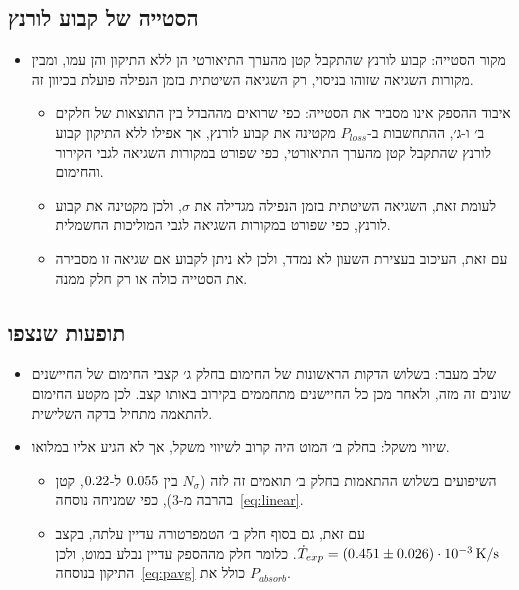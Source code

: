 \documentclass[10pt,a4paper]{article}
\newcommand{\U}[1]{\,\mathrm{#1}}
\begin{document}
\subsection*{הסטייה של קבוע לורנץ}
\begin{itemize}\setlength{\itemsep}{2pt}\setlength{\parskip}{0pt}
  \item מקור הסטייה: קבוע לורנץ שהתקבל קטן מהערך התיאורטי הן ללא התיקון והן עמו, ומבין מקורות השגיאה שזוהו בניסוי, רק השגיאה השיטתית בזמן הנפילה פועלת בכיוון זה.
  \begin{itemize}\setlength{\itemsep}{0pt}\setlength{\parskip}{0pt}
    \item איבוד ההספק אינו מסביר את הסטייה: כפי שרואים מההבדל בין התוצאות של חלקים ב׳ ו-ג׳, ההתחשבות ב-$P_{loss}$ מקטינה את קבוע לורנץ, אך אפילו ללא התיקון קבוע לורנץ שהתקבל קטן מהערך התיאורטי, כפי שפורט במקורות השגיאה לגבי הקירור והחימום.
    \item לעומת זאת, השגיאה השיטתית בזמן הנפילה מגדילה את $\sigma$, ולכן מקטינה את קבוע לורנץ, כפי שפורט במקורות השגיאה לגבי המוליכות החשמלית.
    \item עם זאת, העיכוב בעצירת השעון לא נמדד, ולכן לא ניתן לקבוע אם שגיאה זו מסבירה את הסטייה כולה או רק חלק ממנה.
  \end{itemize}
\end{itemize}

\subsection*{תופעות שנצפו}
\begin{itemize}\setlength{\itemsep}{2pt}\setlength{\parskip}{0pt}
  \item שלב מעבר: בשלוש הדקות הראשונות של החימום בחלק ג׳ קצבי החימום של החיישנים שונים זה מזה, ולאחר מכן כל החיישנים מתחממים בקירוב באותו קצב. לכן מקטע החימום להתאמה מתחיל בדקה השלישית.
  \item שיווי משקל: בחלק ב׳ המוט היה קרוב לשיווי משקל, אך לא הגיע אליו במלואו.
  \begin{itemize}\setlength{\itemsep}{0pt}\setlength{\parskip}{0pt}
    \item השיפועים בשלוש ההתאמות בחלק ב׳ תואמים זה לזה ($N_\sigma$ בין $0.055$ ל-$0.22$, קטן בהרבה מ-3), כפי שמניחה נוסחה~\eqref{eq:linear}.
    \item עם זאת, גם בסוף חלק ב׳ הטמפרטורה עדיין עלתה, בקצב $\dot{T}_{exp} = (\CExpRate) \cdot 10^{-3}\U{K/s}$. כלומר חלק מההספק עדיין נבלע במוט, ולכן התיקון בנוסחה~\eqref{eq:pavg} כולל את $P_{absorb}$.
  \end{itemize}
\end{itemize}
\end{document}
